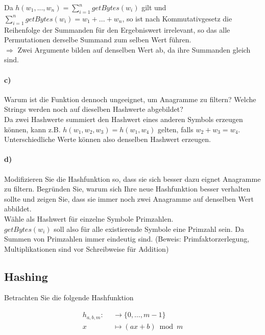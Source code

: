 \documentclass[paper=a4, fontsize=11pt]{scrartcl}
\numberwithin{equation}{section}
\numberwithin{figure}{section}
\numberwithin{table}{section}
\begin{document}
Da $h(w_{1}, ..., w_{n})= \sum^{n}_{i=1} getBytes(w_{i})$ gilt und $\sum^{n}_{i=1} getBytes(w_{i})=w_{1}+...+w_{n}$, so ist nach Kommutativgesetz die Reihenfolge der Summanden für den Ergebniswert irrelevant, so das alle Permutationen derselbe Summand zum selben Wert führen. \\

$\Rightarrow$ Zwei Argumente bilden auf denselben Wert ab, da ihre Summanden gleich sind.

\paragraph{c)} 
Warum ist die Funktion dennoch ungeeignet, um Anagramme zu filtern? Welche Strings werden noch auf dieselben Hashwerte abgebildet? \\

Da zwei Hashwerte summiert den Hashwert eines anderen Symbols erzeugen können, kann z.B. $h(w_{1},w_{2},w_{3})=h(w_{1},w_{4})$ gelten, falls $w_{2}+w_{3}=w_{4}$. Unterschiedliche Werte können also denselben Hashwert erzeugen.

\paragraph{d)}
Modifizieren Sie die Hashfunktion so, dass sie sich besser dazu eignet Anagramme zu filtern. Begründen Sie, warum sich Ihre neue Hashfunktion besser verhalten sollte und zeigen Sie, dass sie immer noch zwei Anagramme auf denselben Wert abbildet. \\

Wähle als Hashwert für einzelne Symbole Primzahlen. \\
$getBytes(w_{i})$ soll also für alle existierende Symbole eine Primzahl sein. Da Summen von Primzahlen immer eindeutig sind. (Beweis: Primfaktorzerlegung, Multiplikationen sind vor Schreibweise für Addition)

\subsection{Hashing}
Betrachten Sie die folgende Hashfunktion

\begin{align*}
  h_{a,b,m}\colon\ \ &\rightarrow \{0,\dots, m-1\}\\
  x &\mapsto( a x +b) \bmod m
\end{align*}
\end{document}
